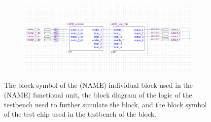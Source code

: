 \documentclass[a4paper]{article}
\begin{document}
\begin{figure}[h]
\begin{subfigure}[t]{.4\textwidth}
  \end{subfigure}
  \centering
  \begin{subfigure}[t]{.98\textwidth}
    \includegraphics[width=.98\textwidth]{images/testbench_placeholder.png}
  \end{subfigure}
  \caption{The block symbol of the (NAME) individual block used in the (NAME) functional unit, the block diagram of the logic of the testbench used to further simulate the block, and the block symbol of the test chip used in the testbench of the block.}
    \label{fig:individual-1-1-block}
\end{figure}
\end{document}
